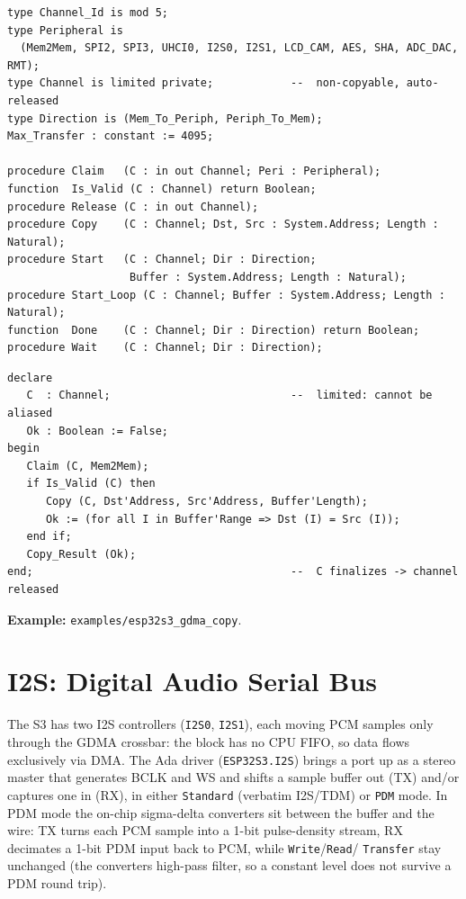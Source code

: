 \begin{lstlisting}
type Channel_Id is mod 5;
type Peripheral is
  (Mem2Mem, SPI2, SPI3, UHCI0, I2S0, I2S1, LCD_CAM, AES, SHA, ADC_DAC, RMT);
type Channel is limited private;            --  non-copyable, auto-released
type Direction is (Mem_To_Periph, Periph_To_Mem);
Max_Transfer : constant := 4095;

procedure Claim   (C : in out Channel; Peri : Peripheral);
function  Is_Valid (C : Channel) return Boolean;
procedure Release (C : in out Channel);
procedure Copy    (C : Channel; Dst, Src : System.Address; Length : Natural);
procedure Start   (C : Channel; Dir : Direction;
                   Buffer : System.Address; Length : Natural);
procedure Start_Loop (C : Channel; Buffer : System.Address; Length : Natural);
function  Done    (C : Channel; Dir : Direction) return Boolean;
procedure Wait    (C : Channel; Dir : Direction);
\end{lstlisting}

\begin{lstlisting}
declare
   C  : Channel;                            --  limited: cannot be aliased
   Ok : Boolean := False;
begin
   Claim (C, Mem2Mem);
   if Is_Valid (C) then
      Copy (C, Dst'Address, Src'Address, Buffer'Length);
      Ok := (for all I in Buffer'Range => Dst (I) = Src (I));
   end if;
   Copy_Result (Ok);
end;                                        --  C finalizes -> channel released
\end{lstlisting}


\noindent\textbf{Example:} \texttt{examples/esp32s3\_gdma\_copy}.

\section{I2S: Digital Audio Serial Bus}
\label{app:int:i2s}

The S3 has two I2S controllers (\texttt{I2S0}, \texttt{I2S1}), each moving PCM
samples only through the GDMA crossbar: the block has no CPU FIFO, so data
flows exclusively via DMA. The Ada driver (\texttt{ESP32S3.I2S}) brings a port up
as a stereo master that generates BCLK and WS and shifts a sample buffer out (TX)
and/or captures one in (RX), in either \texttt{Standard} (verbatim I2S/TDM) or
\texttt{PDM} mode. In PDM mode the on-chip sigma-delta converters sit between the
buffer and the wire: TX turns each PCM sample into a 1-bit pulse-density stream,
RX decimates a 1-bit PDM input back to PCM, while \texttt{Write}/\texttt{Read}/%
\texttt{Transfer} stay unchanged (the converters high-pass filter, so a constant
level does not survive a PDM round trip).

